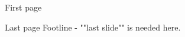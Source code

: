 \documentclass{beamer}
\begin{document}
\begin{frame}    
First page    
\end{frame}

\begin{frame}   
Last page
Footline - ""last slide"" is needed here.
\end{frame}
\end{document}
